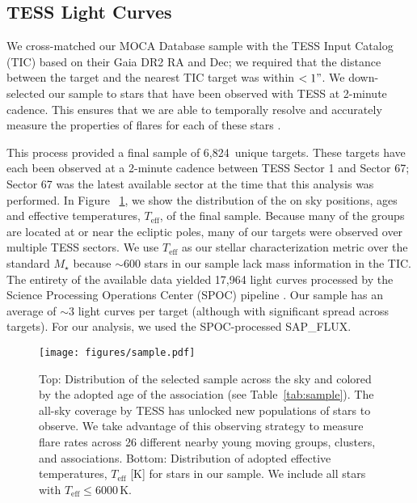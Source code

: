\documentclass[twocolumn, linenumbers]{aastex631}
\newcommand{\nstars}{6,824}
\begin{document}
\subsection{TESS Light Curves}\label{subsec2:TESS_lightcurve}

We cross-matched our MOCA Database sample with the TESS Input Catalog (TIC) based on their Gaia DR2 RA and Dec; we required that the distance between the target and the nearest
TIC target was within $<1"$. We down-selected our sample to stars that have been observed with TESS at 2-minute cadence. This ensures that we are able to temporally resolve and
accurately measure the properties of flares for each of these stars \citep{howard22}.

This process provided a final sample of \nstars\ unique targets. These targets have each been observed at a 2-minute cadence between TESS Sector 1 and Sector 67; Sector 67 was
the latest available sector at the time that this analysis was performed. In Figure ~\ref{fig:sample}, we show the distribution of the on sky positions, ages and effective
temperatures, $T_\textrm{eff}$, of the final sample. Because many of the groups are located at or near the ecliptic poles, many of our targets were observed over multiple TESS
sectors. We use $T_\textrm{eff}$ as our stellar characterization metric over the standard $M_\star$ because $\sim 600$ stars in our sample lack mass information in the TIC.
The entirety of the available data yielded 17,964 light curves processed by the Science Processing Operations Center (SPOC) pipeline \citep{jenkins16}. Our sample has an average
of $\sim 3$ light curves per target (although with significant spread across targets). For our analysis, we used the SPOC-processed SAP\_FLUX.

\begin{figure}[ht!]
    \begin{centering}
        \texttt{[image: figures/sample.pdf]}
        \caption{
            Top: Distribution of the selected sample across the sky and colored by the adopted age of the association (see Table~\ref{tab:sample}). The all-sky coverage by TESS
            has unlocked new populations of stars to observe. We take advantage of this observing strategy to measure flare rates across 26 different nearby young moving groups,
            clusters, and associations. Bottom: Distribution of adopted effective temperatures, $T_\textrm{eff}$ [K] for stars in our sample. We include all stars with $T_\textrm{eff} \leq 6000$\,K.
        }
        \label{fig:sample}
    \end{centering}
\end{figure}
\end{document}
